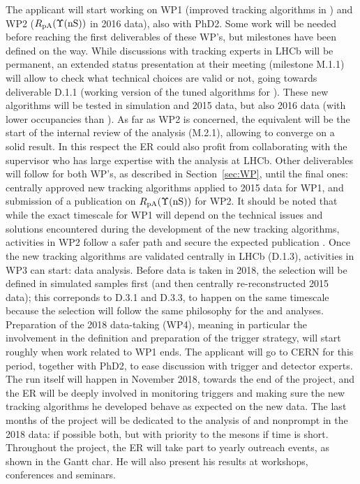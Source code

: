 \documentclass[a4paper,11pt]{article}
\newcommand{\ER}{ER\xspace}
\newcommand{\supervisor}{the supervisor\xspace}
\begin{document}
The applicant will start working on WP1 (improved tracking algorithms in \pbpb) and WP2 ($R_{\text{pA}}(\Upsilon\text{(nS)})$ in 2016 \pPb data), also with PhD2. Some work will be needed before reaching the first deliverables of these WP's, but milestones have been defined on the way. While discussions with tracking experts in LHCb will be permanent, an extended status presentation at their meeting (milestone M.1.1) will allow to check what technical choices are valid or not, going towards deliverable D.1.1 (working version of the tuned algorithms for \pbpb). These new algorithms will be tested in \pbpb simulation and 2015 data, but also 2016 \pPb data (with lower occupancies than \pbpb). As far as WP2 is concerned, the equivalent will be the start of the internal review of the analysis (M.2.1), allowing to converge on a solid result. In this respect the \ER could also profit from collaborating with \supervisor who has large expertise with the \PgU analysis at LHCb. Other deliverables will follow for both WP's, as described in Section~\ref{sec:WP}, until the final ones: centrally approved new \pbpb tracking algorithms applied to 2015 \pbpb data for WP1, and submission of a publication on $R_{\text{pA}}(\Upsilon\text{(nS)})$ for WP2. It should be noted that while the exact timescale for WP1 will depend on the technical issues and solutions encountered during the development of the new tracking algorithms, activities in WP2 follow a safer path and secure the expected publication .
%
Once the new tracking algorithms are validated centrally in LHCb (D.1.3), activities in WP3 can start: \pbpb data analysis. Before \pbpb data is taken in 2018, the selection will be defined in simulated samples first (and then centrally re-reconstructed 2015 \pbpb data); this correponds to D.3.1 and D.3.3, to happen on the same timescale because the selection will follow the same philosophy for the \Dz and \JPsi analyses. Preparation of the 2018 \pbpb data-taking (WP4), meaning in particular the involvement in the definition and preparation of the trigger strategy, will start roughly when work related to WP1 ends. The applicant will go to CERN for this period, together with PhD2, to ease discussion with trigger and detector experts. The \pbpb run itself will happen in November 2018, towards the end of the project, and the \ER will be deeply involved in monitoring triggers and making sure the new \pbpb tracking algorithms he developed behave as expected on the new data. The last months of the project will be dedicated to the analysis of \Dz and nonprompt \JPsi in the 2018 \pbpb data: if possible both, but with priority to the \Dz mesons if time is short.
%
Throughout the project, the \ER will take part to yearly outreach events, as shown in the Gantt char. He will also present his results at workshops, conferences and seminars.
\end{document}
